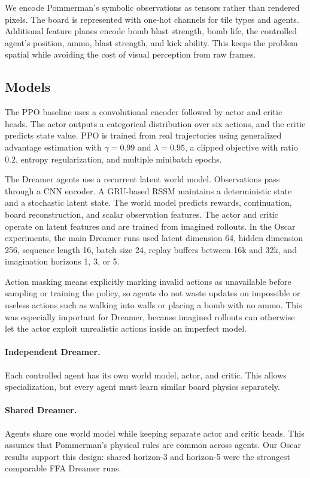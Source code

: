 \documentclass[11pt]{article}
\begin{document}
We encode Pommerman's symbolic observations as tensors rather than rendered pixels. The board is represented with one-hot channels for tile types and agents. Additional feature planes encode bomb blast strength, bomb life, the controlled agent's position, ammo, blast strength, and kick ability. This keeps the problem spatial while avoiding the cost of visual perception from raw frames.

\subsection{Models}

The PPO baseline uses a convolutional encoder followed by actor and critic heads. The actor outputs a categorical distribution over six actions, and the critic predicts state value. PPO is trained from real trajectories using generalized advantage estimation with $\gamma=0.99$ and $\lambda=0.95$, a clipped objective with ratio $0.2$, entropy regularization, and multiple minibatch epochs.

The Dreamer agents use a recurrent latent world model. Observations pass through a CNN encoder. A GRU-based RSSM maintains a deterministic state and a stochastic latent state. The world model predicts rewards, continuation, board reconstruction, and scalar observation features. The actor and critic operate on latent features and are trained from imagined rollouts. In the Oscar experiments, the main Dreamer runs used latent dimension 64, hidden dimension 256, sequence length 16, batch size 24, replay buffers between 16k and 32k, and imagination horizons 1, 3, or 5.

Action masking means explicitly marking invalid actions as unavailable before sampling or training the policy, so agents do not waste updates on impossible or useless actions such as walking into walls or placing a bomb with no ammo. This was especially important for Dreamer, because imagined rollouts can otherwise let the actor exploit unrealistic actions inside an imperfect model.

\paragraph{Independent Dreamer.}
Each controlled agent has its own world model, actor, and critic. This allows specialization, but every agent must learn similar board physics separately.

\paragraph{Shared Dreamer.}
Agents share one world model while keeping separate actor and critic heads. This assumes that Pommerman's physical rules are common across agents. Our Oscar results support this design: shared horizon-3 and horizon-5 were the strongest comparable FFA Dreamer runs.
\end{document}
